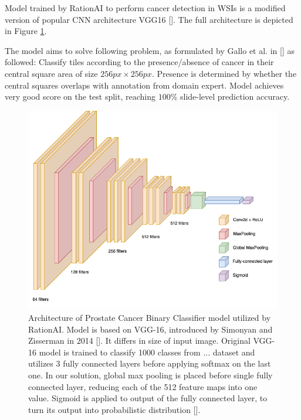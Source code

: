 Model trained by RationAI to perform cancer detection in WSIs is a modified version of popular CNN architecture VGG16 []. The full architecture is depicted in Figure \ref{fig:rationai-vgg16}.

The model aims to solve following problem, as formulated by Gallo et al. in [] as followed: Classify tiles according to the presence/absence of cancer in their central square area of size $256 px \times 256 px$. Presence is determined by whether the central squares overlaps with annotation from domain expert. Model achieves very good score on the test split, reaching $100$\% slide-level prediction accuracy.

\begin{figure}[!h]
    \begin{center}
    \begin{minipage}{0.75\textwidth}
      \includegraphics[width=\textwidth]{img/nn-arch.png}
    \end{minipage}
    \caption{Architecture of Prostate Cancer Binary Classifier model utilized by RationAI. Model is based on VGG-16, introduced by Simonyan and Zisserman in 2014 []. It differs in size of input image. Original VGG-16 model is trained to classify 1000 classes from ... dataset and utilizes 3 fully connected layers before applying softmax on the last one. In our solution, global max pooling is placed before single fully connected layer, reducing each of the 512 feature maps into one value. Sigmoid is applied to output of the fully connected layer, to turn its output into probabilistic distribution [].}
    \label{fig:rationai-vgg16}
    \end{center}

\end{figure}

